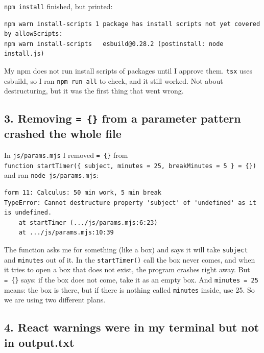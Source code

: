 \documentclass[
  10pt,
]{article}
\begin{document}
\texttt{npm\ install} finished, but printed:

\begin{verbatim}
npm warn install-scripts 1 package has install scripts not yet covered by allowScripts:
npm warn install-scripts   esbuild@0.28.2 (postinstall: node install.js)
\end{verbatim}

My npm does not run install scripts of packages until I approve them.
\texttt{tsx} uses esbuild, so I ran \texttt{npm\ run\ all} to check, and
it still worked. Not about destructuring, but it was the first thing
that went wrong.

\hypertarget{3-removing---from-a-parameter-pattern-crashed-the-whole-file}{%
\subsection{\texorpdfstring{3. Removing \texttt{=\ \{\}} from a
parameter pattern crashed the whole
file}{3. Removing  from a parameter pattern crashed the whole file}}\label{3-removing---from-a-parameter-pattern-crashed-the-whole-file}}

In \texttt{js/\allowbreak{}params.\allowbreak{}mjs} I removed
\texttt{=\ \{\}} from
\texttt{function\ startTimer(\{\ subject,\ minutes\ =\ 25,\ breakMinutes\ =\ 5\ \}\ =\ \{\})}
and ran \texttt{node\ js/\allowbreak{}params.\allowbreak{}mjs}:

\begin{verbatim}
form 11: Calculus: 50 min work, 5 min break
TypeError: Cannot destructure property 'subject' of 'undefined' as it is undefined.
    at startTimer (.../js/params.mjs:6:23)
    at .../js/params.mjs:10:39
\end{verbatim}

The function asks me for something (like a box) and says it will take
\texttt{subject} and \texttt{minutes} out of it. In the
\texttt{startTimer()} call the box never comes, and when it tries to
open a box that does not exist, the program crashes right away. But
\texttt{=\ \{\}} says: if the box does not come, take it as an empty
box. And \texttt{minutes\ =\ 25} means: the box is there, but if there
is nothing called \texttt{minutes} inside, use 25. So we are using two
different plans.

\hypertarget{4-react-warnings-were-in-my-terminal-but-not-in-outputtxt}{%
\subsection{4. React warnings were in my terminal but not in
output.txt}\label{4-react-warnings-were-in-my-terminal-but-not-in-outputtxt}}
\end{document}

